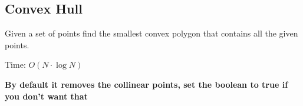 \subsection{Convex Hull}

Given a set of points find the smallest convex polygon that contains all the given points.

Time: $O(N \cdot \log{N})$

\textbf{By default it removes the collinear points, set the boolean to true if you don't want that}

